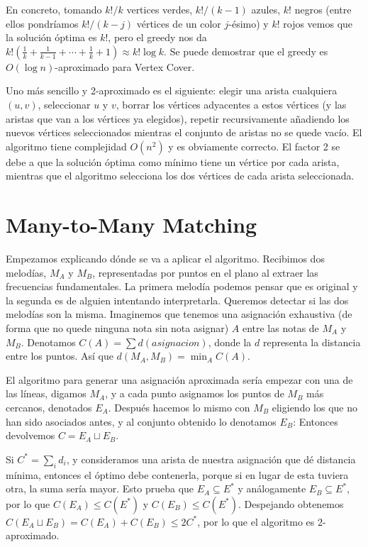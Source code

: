 \documentclass[AL.tex]{subfiles}
\begin{document}
\begin{ej}
En concreto, tomando $k!/k$ vertices verdes, $k!/(k-1)$ azules, $k!$ negros (entre ellos pondríamos $k!/(k-j)$ vértices de un color $j$-ésimo) y $k!$ rojos vemos que la solución óptima es $k!$, pero el greedy nos da $k!\left(\frac{1}{k}+\frac{1}{k-1}+\cdots +\frac{1}{k}+1\right)\approx k!\log k$. Se puede demostrar que el greedy es $O(\log n)$-aproximado para Vertex Cover. 

Uno más sencillo y 2-aproximado es el siguiente: elegir una arista cualquiera $(u,v)$, seleccionar $u$ y $v$, borrar los vértices adyacentes a estos vértices (y las aristas que van a los vértices ya elegidos), repetir recursivamente añadiendo los nuevos vértices seleccionados mientras el conjunto de aristas no se quede vacío. El algoritmo tiene complejidad $O(n^2)$ y es obviamente correcto. El factor 2 se debe a que la solución óptima como mínimo tiene un vértice por cada arista, mientras que el algoritmo selecciona los dos vértices de cada arista seleccionada. 
\end{ej}

\section{Many-to-Many Matching}
Empezamos explicando dónde se va a aplicar el algoritmo. Recibimos dos melodías, $M_A$ y $M_B$, representadas por puntos en el plano al extraer las frecuencias fundamentales. La primera melodía podemos pensar que es original y la segunda es de alguien intentando interpretarla. Queremos detectar si las dos melodías son la misma. Imaginemos que tenemos una asignación exhaustiva (de forma que no quede ninguna nota sin nota asignar) $A$ entre las notas de $M_A$ y $M_B$. Denotamos $C(A)=\sum d(asignacion)$, donde la $d$ representa la distancia entre los puntos. Así que $d(M_A,M_B)=\min_A C(A)$. 

El algoritmo para generar una asignación aproximada sería empezar con una de las líneas, digamos $M_A$, y a cada punto asignamos los puntos de $M_B$ más cercanos, denotados $E_A$. Después hacemos lo mismo con $M_B$ eligiendo los que no han sido asociados antes, y al conjunto obtenido lo denotamos $E_B$: Entonces devolvemos $C=E_A\sqcup E_B$. 

Si $C^*=\sum_i d_i$, y consideramos una arista de nuestra asignación que dé distancia mínima, entonces el óptimo debe contenerla, porque si en lugar de esta tuviera otra, la suma sería mayor. Esto prueba que $E_A\subseteq E^*$ y análogamente $E_B\subseteq E^*$, por lo que $C(E_A)\leq C(E^*)$ y $C(E_B)\leq C(E^*)$. Despejando obtenemos $C(E_A\sqcup E_B)=C(E_A)+C(E_B)\leq 2C^*$, por lo que el algoritmo es 2-aproximado. 
\end{document}
